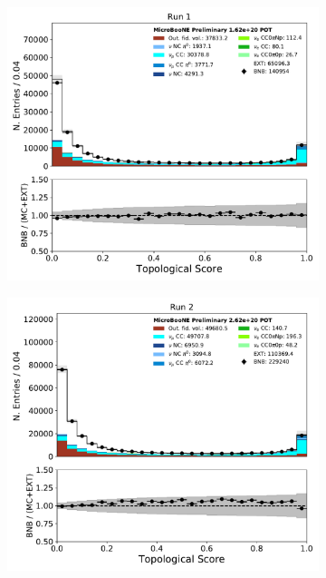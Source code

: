 \begin{figure}[hbt!] 
\begin{center}
    \begin{subfigure}[b]{0.35\textwidth}
        \centering
        \includegraphics[width=1.00\textwidth]{NuMuCCsel/Images/Ryan/Run1/topological_score_08062020_samples_longest_noCRT_event_category.pdf}
    \end{subfigure}
    \begin{subfigure}[b]{0.35\textwidth}
        \centering
        \includegraphics[width=1.00\textwidth]{NuMuCCsel/Images/Ryan/Run2/topological_score_08062020_samples_longest_noCRT_event_category.pdf}

\end{subfigure}
\end{center}
\end{figure}

